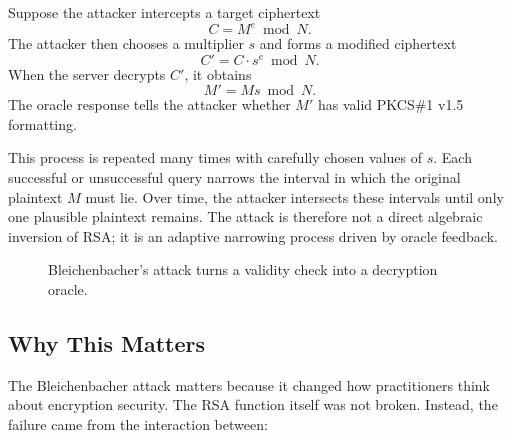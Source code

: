 Suppose the attacker intercepts a target ciphertext
\[
C = M^e \bmod N.
\]
The attacker then chooses a multiplier $s$ and forms a modified ciphertext
\[
C' = C \cdot s^e \bmod N.
\]
When the server decrypts $C'$, it obtains
\[
M' = Ms \bmod N.
\]
The oracle response tells the attacker whether $M'$ has valid PKCS\#1 v1.5 formatting.

This process is repeated many times with carefully chosen values of $s$. Each successful or unsuccessful query narrows the interval in which the original plaintext $M$ must lie. Over time, the attacker intersects these intervals until only one plausible plaintext remains. The attack is therefore not a direct algebraic inversion of RSA; it is an adaptive narrowing process driven by oracle feedback.

\begin{figure}[h]
\centering
{}

\vspace{0.5em}

\caption{Bleichenbacher's attack turns a validity check into a decryption oracle.}
\end{figure}

\subsection{Why This Matters}

The Bleichenbacher attack matters because it changed how practitioners think about encryption security. The RSA function itself was not broken. Instead, the failure came from the interaction between:

